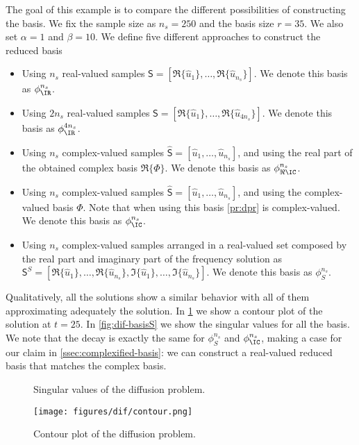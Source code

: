 The goal of this example is to compare the different possibilities of constructing the basis. We fix the sample size as $n_s = 250$ and the basis size $r=35$. We also set $\alpha=1$ and $\beta=10$. We define five different approaches to construct the reduced basis
\begin{itemize}
    \item Using $n_s$ real-valued samples $\bm{\mathsf{S}} = [\Re \{\widehat{u}_1 \}, \ldots, \Re \{\widehat{u}_{n_s} \}]$. We denote this basis as $\phi_\IR^{n_s}$.
    \item Using $2n_s$ real-valued samples $\bm{\mathsf{S}} = [\Re \{\widehat{u}_1 \}, \ldots, \Re \{\widehat{u}_{4n_s} \}]$. We denote this basis as $\phi_\IR^{4n_s}$.
    \item Using $n_s$ complex-valued samples $\widehat{\bm{\mathsf{S}}} = [\widehat{u}_1, \ldots, \widehat{u}_{n_s}]$, and using the real part of the obtained complex basis $\Re \{ \Phi \}$. We denote this basis as $\phi_{\Re\IC}^{n_s}$.
    \item Using $n_s$ complex-valued samples $\widehat{\bm{\mathsf{S}}} = [\widehat{u}_1, \ldots, \widehat{u}_{n_s}]$, and using the complex-valued basis $\Phi$. Note that when using this basis \cref{pr:dpr} is complex-valued. We denote this basis as $\phi_\IC^{n_s}$.
    \item Using $n_s$ complex-valued samples arranged in a real-valued set composed by the real part and imaginary part of the frequency solution as $\bm{\mathsf{S}}^S = [\Re \{\widehat{u}_1 \}, \ldots, \Re \{\widehat{u}_{n_s}\}, \Im \{\widehat{u}_1 \}, \ldots, \Im \{\widehat{u}_{n_s}\}]$. We denote this basis as $\phi_{S}^{n_s}$.
\end{itemize}

Qualitatively, all the solutions show a similar behavior with all of them approximating adequately the solution. In \cref{fig:dif-contour} we show a contour plot of the solution at $t=25$. In \cref{fig:dif-basisS} we show the singular values for all the basis. We note that the decay is exactly the same for $\phi_{S}^{n_s}$ and $\phi_\IC^{n_s}$, making a case for our claim in \cref{ssec:complexified-basis}: we can construct a real-valued reduced basis that matches the complex basis.
\begin{figure}[H]
\RawFloats
\begin{minipage}[t]{.57\textwidth}
	
	\caption{Singular values of the diffusion problem.} 
	\label{fig:dif-basisS}
\end{minipage}\hfill%
\begin{minipage}[t]{.4\textwidth}
    \texttt{[image: figures/dif/contour.png]}
 	\caption{Contour plot of the diffusion problem.} 
	\label{fig:dif-contour}
\end{minipage}
\end{figure}

